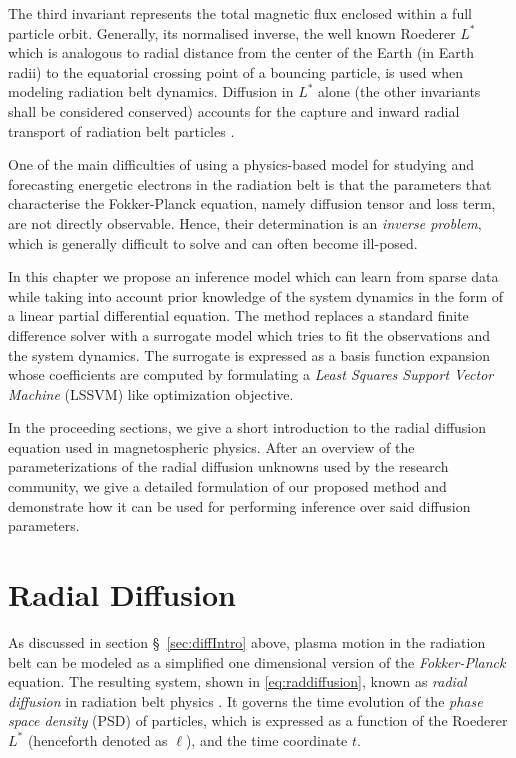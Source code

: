 The third invariant represents the total magnetic flux enclosed within a full particle orbit. 
Generally, its normalised inverse, the well known Roederer $L^{*}$ \citep{Roederer1970} which is 
analogous to radial distance from the center of the Earth (in Earth radii) to the equatorial 
crossing point of a bouncing particle, is used when modeling radiation belt dynamics. Diffusion in 
$L^{*}$ alone (the other invariants shall be considered conserved) accounts for the capture and 
inward radial transport of radiation belt particles \citep{Roederer1970,JGR:JGR4463}.

One of the main difficulties of using a physics-based model for studying and forecasting energetic 
electrons in the radiation belt is that the parameters that characterise the Fokker-Planck 
equation, namely diffusion tensor and loss term, are not directly observable. Hence, their 
determination is an \emph{inverse problem}, which is generally difficult to solve and can often 
become ill-posed.

In this chapter we propose an inference model which can learn from sparse data while taking into 
account prior knowledge of the system dynamics in the form of a linear partial differential 
equation. The method replaces a standard finite difference solver with a surrogate model which 
tries to fit the observations and the system dynamics. The surrogate is expressed as a basis 
function expansion whose coefficients are computed by formulating a 
\emph{Least Squares Support Vector Machine} (LSSVM) like optimization objective.

In the proceeding sections, we give a short introduction to the radial diffusion equation used in 
magnetospheric physics. After an overview of the parameterizations of the radial diffusion unknowns 
used by the research community, we give a detailed formulation of our proposed method and 
demonstrate how it can be used for performing inference over said diffusion parameters.

\section{Radial Diffusion}

As discussed in section \S~\ref{sec:diffIntro} above, plasma motion in the radiation belt can be 
modeled as a simplified one dimensional version of the \emph{Fokker-Planck} equation. The resulting 
system, shown in \cref{eq:raddiffusion}, known as \emph{radial diffusion} in radiation belt 
physics \citep{JGRA:JGRA9345}. It governs the time evolution of the \emph{phase space density} 
(PSD) of particles, which is expressed as a function of the Roederer $L^{*}$ 
(henceforth denoted as $\ell$), and the time coordinate $t$.

